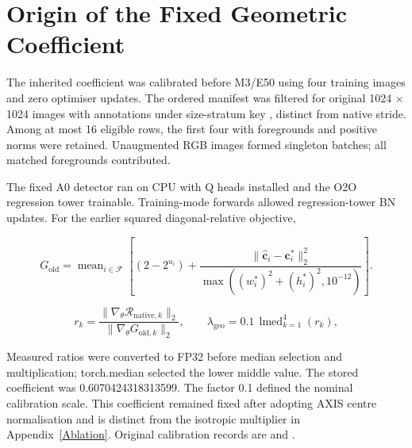\section{Origin of the Fixed Geometric Coefficient}
\label{app:lambda-provenance}

The inherited coefficient was calibrated before M3/E50 using four training images and zero optimiser updates. The ordered manifest was filtered for original 1024 × 1024 images with annotations under size-stratum key , distinct from native stride. Among at most 16 eligible rows, the first four with foregrounds and positive norms were retained. Unaugmented RGB images formed singleton batches; all matched foregrounds contributed.

The fixed A0 detector ran on CPU with Q heads installed and the O2O regression tower trainable. Training-mode forwards allowed regression-tower BN updates. For the earlier squared diagonal-relative objective,

\[
G_{\mathrm{old}}=\operatorname{mean}_{i\in\mathcal F}
\left[(2-2^{u_i})+
\frac{\|\hat{\boldsymbol c}_i-\boldsymbol c_i^*\|_2^2}
{\max((w_i^*)^2+(h_i^*)^2,10^{-12})}\right].
\]

\[
r_k=\frac{\|\nabla_\theta\mathcal R_{\mathrm{native},k}\|_2}
{\|\nabla_\theta G_{\mathrm{old},k}\|_2},
\qquad
\lambda_{\mathrm{geo}}=0.1\,\operatorname{lmed}_{k=1}^{4}(r_k),
\]

Measured ratios were converted to FP32 before median selection and multiplication; torch.median selected the lower middle value. The stored coefficient was 0.6070424318313599. The factor 0.1 defined the nominal calibration scale. This coefficient remained fixed after adopting AXIS centre normalisation and is distinct from the isotropic multiplier in Appendix~\ref{Ablation}. Original calibration records are  and .

\FloatBarrier
